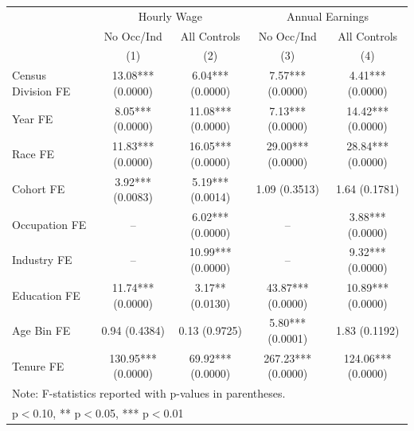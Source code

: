 \begin{tabular}{lcccc}
\hline\hline
 & \multicolumn{2}{c}{Hourly Wage} & \multicolumn{2}{c}{Annual Earnings} \\
 & No Occ/Ind & All Controls & No Occ/Ind & All Controls \\
 & (1) & (2) & (3) & (4) \\
\hline
Census Division FE&13.08*** (0.0000)&6.04*** (0.0000)&7.57*** (0.0000)&4.41*** (0.0000)\\
Year FE&8.05*** (0.0000)&11.08*** (0.0000)&7.13*** (0.0000)&14.42*** (0.0000)\\
Race FE&11.83*** (0.0000)&16.05*** (0.0000)&29.00*** (0.0000)&28.84*** (0.0000)\\
Cohort FE&3.92*** (0.0083)&5.19*** (0.0014)&1.09 (0.3513)&1.64 (0.1781)\\
Occupation FE&--&6.02*** (0.0000)&--&3.88*** (0.0000)\\
Industry FE&--&10.99*** (0.0000)&--&9.32*** (0.0000)\\
Education FE&11.74*** (0.0000)&3.17** (0.0130)&43.87*** (0.0000)&10.89*** (0.0000)\\
Age Bin FE&0.94 (0.4384)&0.13 (0.9725)&5.80*** (0.0001)&1.83 (0.1192)\\
Tenure FE&130.95*** (0.0000)&69.92*** (0.0000)&267.23*** (0.0000)&124.06*** (0.0000)\\
\hline
\multicolumn{5}{l}{\footnotesize Note: F-statistics reported with p-values in parentheses.} \\
\multicolumn{5}{l}{\footnotesize * p$<$0.10, ** p$<$0.05, *** p$<$0.01} \\
\hline\hline
\end{tabular}
